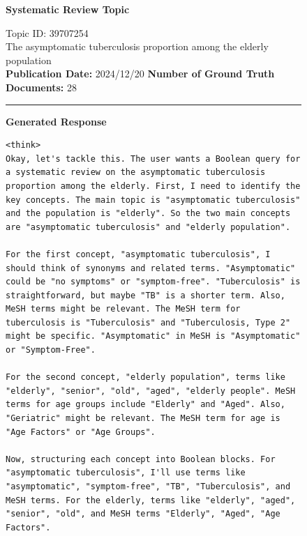 \begin{figure}[p]
	\centering
	
	\begin{CombinedBox}
		\textbf{\small Systematic Review Topic}
		
		\vspace{0.3em}
		{\footnotesize
			Topic ID: 39707254 \\ The asymptomatic tuberculosis proportion among the elderly population
			\\
			\textbf{Publication Date:} 2024/12/20 \quad \textbf{Number of Ground Truth Documents:} 28
		}
		
		\vspace{0.5em}
		\hrule
		\vspace{0.5em}
		
		\textbf{\small Generated Response}
		
		\vspace{0.3em}
		\begin{lstlisting}[basicstyle=\ttfamily\scriptsize, breaklines=true, breakatwhitespace=true, showstringspaces=false, columns=fullflexible, keepspaces=true, breakindent=0pt, frame=none, xleftmargin=0pt, xrightmargin=0pt]
<think>
Okay, let's tackle this. The user wants a Boolean query for a systematic review on the asymptomatic tuberculosis proportion among the elderly. First, I need to identify the key concepts. The main topic is "asymptomatic tuberculosis" and the population is "elderly". So the two main concepts are "asymptomatic tuberculosis" and "elderly population".

For the first concept, "asymptomatic tuberculosis", I should think of synonyms and related terms. "Asymptomatic" could be "no symptoms" or "symptom-free". "Tuberculosis" is straightforward, but maybe "TB" is a shorter term. Also, MeSH terms might be relevant. The MeSH term for tuberculosis is "Tuberculosis" and "Tuberculosis, Type 2" might be specific. "Asymptomatic" in MeSH is "Asymptomatic" or "Symptom-Free".

For the second concept, "elderly population", terms like "elderly", "senior", "old", "aged", "elderly people". MeSH terms for age groups include "Elderly" and "Aged". Also, "Geriatric" might be relevant. The MeSH term for age is "Age Factors" or "Age Groups".

Now, structuring each concept into Boolean blocks. For "asymptomatic tuberculosis", I'll use terms like "asymptomatic", "symptom-free", "TB", "Tuberculosis", and MeSH terms. For the elderly, terms like "elderly", "aged", "senior", "old", and MeSH terms "Elderly", "Aged", "Age Factors".


\end{lstlisting}
\end{CombinedBox}
\end{figure}
